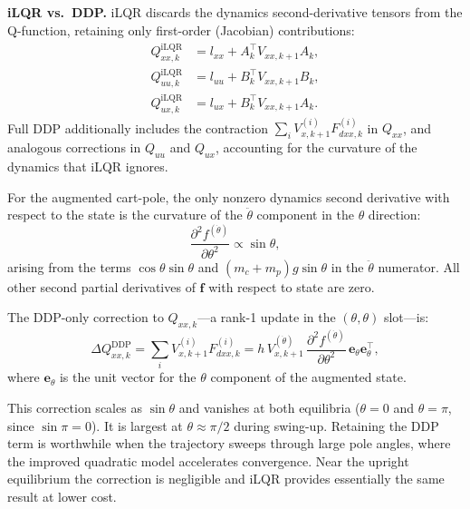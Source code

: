 \subsection{}
\textbf{iLQR vs.\ DDP.} iLQR discards the dynamics second-derivative tensors from the Q-function, retaining only first-order (Jacobian) contributions:
\begin{align*}
    Q_{xx,k}^{\mathrm{iLQR}} &= l_{xx} + A_k^\top V_{xx,k+1}A_k, \\
    Q_{uu,k}^{\mathrm{iLQR}} &= l_{uu} + B_k^\top V_{xx,k+1}B_k, \\
    Q_{ux,k}^{\mathrm{iLQR}} &= l_{ux} + B_k^\top V_{xx,k+1}A_k.
\end{align*}
Full DDP additionally includes the contraction $\sum_i V_{x,k+1}^{(i)}F_{dxx,k}^{(i)}$ in $Q_{xx}$, and analogous corrections in $Q_{uu}$ and $Q_{ux}$, accounting for the curvature of the dynamics that iLQR ignores.

For the augmented cart-pole, the only nonzero dynamics second derivative with respect to the state is the curvature of the $\ddot{\theta}$ component in the $\theta$ direction:
\begin{equation}
    \frac{\partial^2 f^{(\dot\theta)}}{\partial\theta^2} \propto \sin\theta,
\end{equation}
arising from the terms $\cos\theta\sin\theta$ and $(m_c+m_p)g\sin\theta$ in the $\ddot\theta$ numerator. All other second partial derivatives of $\mathbf{f}$ with respect to state are zero.

The DDP-only correction to $Q_{xx,k}$---a rank-1 update in the $(\theta,\theta)$ slot---is:
\begin{equation}
    \Delta Q_{xx,k}^{\mathrm{DDP}} = \sum_i V_{x,k+1}^{(i)} F_{dxx,k}^{(i)} = h\,V_{x,k+1}^{(\dot\theta)}\,\frac{\partial^2 f^{(\dot\theta)}}{\partial\theta^2}\,\mathbf{e}_\theta\mathbf{e}_\theta^\top,
\end{equation}
where $\mathbf{e}_\theta$ is the unit vector for the $\theta$ component of the augmented state.

This correction scales as $\sin\theta$ and vanishes at both equilibria ($\theta=0$ and $\theta=\pi$, since $\sin\pi = 0$). It is largest at $\theta \approx \pi/2$ during swing-up. Retaining the DDP term is worthwhile when the trajectory sweeps through large pole angles, where the improved quadratic model accelerates convergence. Near the upright equilibrium the correction is negligible and iLQR provides essentially the same result at lower cost.

